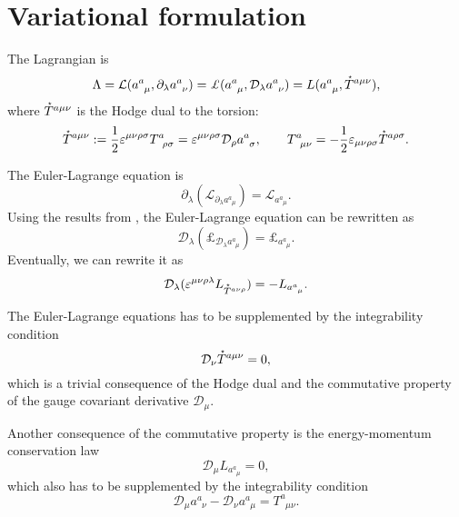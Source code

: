 \documentclass[
10pt, %
a4paper, %
oneside, %
headinclude,footinclude, %
BCOR5mm, %
]{scrartcl}
\newcommand{\pd}{\partial}
\newcommand{\tetr}[2]{a^{#1}_{\phantom{#1}#2}}
\newcommand{\D}[1]{\mathcal{D}_{#1}} %
\newcommand{\Tors}[2]{T^{#1}_{\phantom{a}#2}}
\newcommand{\Lag}{\mathcal{L}}	%
\newcommand{\Lagcov}{\pounds}%
\newcommand{\Laghodge}{L}%
\newcommand{\veps}{\varepsilon}
\newcommand{\HT}[1]{\accentset{\star}{T}^{#1}}
\begin{document}
\section{Variational formulation}
The Lagrangian is 
\begin{equation}
\Lambda = \Lag(\tetr{a}{\mu},\pd_\lambda\tetr{a}{\nu}) = 
\Lagcov(\tetr{a}{\mu},\D{\lambda}\tetr{a}{\nu})  = \Laghodge(\tetr{a}{\mu},\HT{a\mu\nu}),
\end{equation}
where $ \HT{a\mu\nu} $ is the Hodge dual to the torsion:
\begin{equation}
\HT{a\mu\nu} := \frac{1}{2}\veps^{\mu\nu\rho\sigma}\Tors{a}{\rho\sigma} = 
\veps^{\mu\nu\rho\sigma}\D{\rho}\tetr{a}{\sigma}, \qquad \Tors{a}{\mu\nu} = 
-\frac{1}{2}\veps_{\mu\nu\rho\sigma}\HT{a\rho\sigma}.
\end{equation}




The Euler-Lagrange equation is
\begin{equation}
\pd_\lambda(\Lag_{\pd_\lambda\tetr{a}{\mu}}) = \Lag_{\tetr{a}{\mu}}.
\end{equation}
Using the results from \cite{Lewis2009,Lorce2013}, the Euler-Lagrange equation can be rewritten as
\begin{equation}
\D{\lambda}(\Lagcov_{\D{\lambda}\tetr{a}{\mu}}) = \Lagcov_{\tetr{a}{\mu}}.
\end{equation}
Eventually, we can rewrite it as
\begin{equation}
\D{\lambda}(\veps^{\mu\nu\rho\lambda}\Laghodge_{\HT{a\nu\rho}}) =-\Laghodge_{\tetr{a}{\mu}}.
\end{equation}

The Euler-Lagrange equations has to be supplemented by the integrability condition
\begin{equation}
\D{\nu}\HT{a\mu\nu} = 0,
\end{equation}
which is a trivial consequence of the Hodge dual and the commutative property of the gauge 
covariant derivative $ \D{\mu} $.

Another consequence of the commutative property is the energy-momentum conservation law
\begin{equation}
\D{\mu}\Laghodge_{\tetr{a}{\mu}} = 0,
\end{equation}
which also has to be supplemented by the integrability condition 
\begin{equation}
\D{\mu}\tetr{a}{\nu} - \D{\nu}\tetr{a}{\mu} = \Tors{a}{\mu\nu}.
\end{equation}
\end{document}
